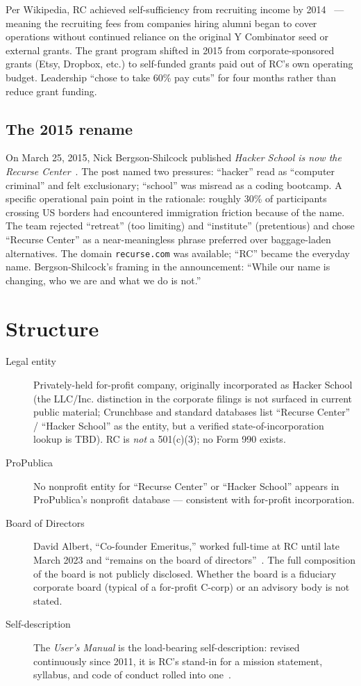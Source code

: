 \documentclass[10pt,letterpaper,twocolumn]{article}
\begin{document}
Per Wikipedia, RC achieved self-sufficiency from recruiting income by 2014~\citep{wikipediarc} --- meaning the recruiting fees from companies hiring alumni began to cover operations without continued reliance on the original Y Combinator seed or external grants. The grant program shifted in 2015 from corporate-sponsored grants (Etsy, Dropbox, etc.) to self-funded grants paid out of RC's own operating budget. Leadership ``chose to take 60\% pay cuts'' for four months rather than reduce grant funding.~\citep{rcseven}

\subsection{The 2015 rename}

On March 25, 2015, Nick Bergson-Shilcock published \emph{Hacker School is now the Recurse Center}~\citep{rcrename}. The post named two pressures: ``hacker'' read as ``computer criminal'' and felt exclusionary; ``school'' was misread as a coding bootcamp. A specific operational pain point in the rationale: roughly 30\% of participants crossing US borders had encountered immigration friction because of the name.~\citep{hnrenamethread} The team rejected ``retreat'' (too limiting) and ``institute'' (pretentious) and chose ``Recurse Center'' as a near-meaningless phrase preferred over baggage-laden alternatives. The domain \texttt{recurse.com} was available; ``RC'' became the everyday name. Bergson-Shilcock's framing in the announcement: ``While our name is changing, who we are and what we do is not.''

\section{Structure}

\begin{description}
\item[Legal entity] Privately-held for-profit company, originally incorporated as Hacker School (the LLC/Inc. distinction in the corporate filings is not surfaced in current public material; Crunchbase and standard databases list ``Recurse Center'' / ``Hacker School'' as the entity, but a verified state-of-incorporation lookup is TBD). RC is \emph{not} a 501(c)(3); no Form 990 exists.
\item[ProPublica] No nonprofit entity for ``Recurse Center'' or ``Hacker School'' appears in ProPublica's nonprofit database --- consistent with for-profit incorporation.
\item[Board of Directors] David Albert, ``Co-founder Emeritus,'' worked full-time at RC until late March 2023 and ``remains on the board of directors''~\citep{rcteam}. The full composition of the board is not publicly disclosed. Whether the board is a fiduciary corporate board (typical of a for-profit C-corp) or an advisory body is not stated.
\item[Self-description] The \emph{User's Manual} is the load-bearing self-description: revised continuously since 2011, it is RC's stand-in for a mission statement, syllabus, and code of conduct rolled into one~\citep{rcmanual}.
\end{description}
\end{document}
